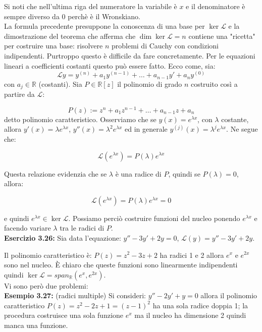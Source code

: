 \documentclass[a4paper,11pt,titlepage]{book}
\begin{document}
Si noti che nell'ultima riga del numeratore la variabile è $x$ e il denominatore è sempre diverso da 0 perchè è il Wronskiano.\\

La formula precedente presuppone la conoscenza di una base per $\ker\mathcal{L}$ e la dimostrazione del teorema che afferma che $\dim\ker\mathcal{L}=n$ contiene una "ricetta" per costruire una base: risolvere $n$ problemi di Cauchy con condizioni indipendenti. Purtroppo questo è difficile da fare concretamente. Per le equazioni lineari a coefficienti costanti questo può essere fatto. Ecco come, sia:
$$\mathcal{L}y=y^{(n)}+a_1y^{(n-1)}+\ldots+a_{n-1}y'+a_ny^{(0)}$$
con $a_j\in\mathbb{R}$ (costanti). Sia $P\in\mathbb{R}[z]$ il polinomio di grado $n$ costruito così a partire da $\mathcal{L}$:

$$P(z):=z^n+a_1z^{n-1}+\ldots+a_{n-1}z+a_n$$
detto polinomio caratteristico. Osserviamo che se $y(x)=e^{\lambda x}$, con $\lambda$ costante, allora $y'(x)=\lambda e^{\lambda x}$, $y''(x)=\lambda^2 e^{\lambda x}$ ed in generale $y^{(j)}(x)=\lambda^j e^{\lambda x}$. Ne segue che:

$$\mathcal{L}(e^{\lambda x})=P(\lambda)e^{\lambda x}$$

Questa relazione evidenzia che se $\lambda$ è una radice di $P$, quindi se $P(\lambda)=0$, allora:

$$\mathcal{L}(e^{\lambda x})=P(\lambda)e^{\lambda x}=0$$

e quindi $e^{\lambda x}\in\ker\mathcal{L}$. Possiamo perciò costruire funzioni del nucleo ponendo $e^{\lambda x}$ e facendo variare $\lambda$ tra le radici di $P$.\\

\textbf{Esercizio 3.26:} Sia data l'equazione: $y''-3y'+2y=0$, $\mathcal{L}(y)=y''-3y'+2y$.

Il polinomio caratteristico è: $P(z)=z^2-3z+2$ ha radici 1 e 2 allora $e^x$ e $e^{2x}$ sono nel nucleo. È chiaro che queste funzioni sono linearmente indipendenti quindi $\ker\mathcal{L}=span_\mathbb{R}( e^x,e^{2x})$.\\

Vi sono però due problemi:\\

\textbf{Esempio 3.27: } (radici multiple) Si consideri: $y''-2y'+y=0$ allora il polinomio caratteristico $P(z)=z^2-2z+1=(z-1)^2$ ha una sola radice doppia 1; la procedura costruisce una sola funzione $e^x$ ma il nucleo ha dimensione 2 quindi manca una funzione.\\
\end{document}
